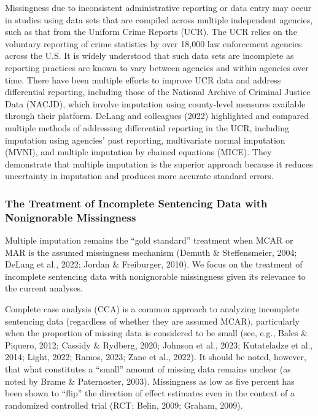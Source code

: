\documentclass[
  letterpaper,
  DIV=11,
  numbers=noendperiod]{scrartcl}
\begin{document}
Missingness due to inconsistent administrative reporting or data entry
may occur in studies using data sets that are compiled across multiple
independent agencies, such as that from the Uniform Crime Reports (UCR).
The UCR relies on the voluntary reporting of crime statistics by over
18,000 law enforcement agencies across the U.S. It is widely understood
that such data sets are incomplete as reporting practices are known to
vary between agencies and within agencies over time. There have been
multiple efforts to improve UCR data and address differential reporting,
including those of the National Archive of Criminal Justice Data
(NACJD), which involve imputation using county-level measures available
through their platform. DeLang and colleagues (2022) highlighted and
compared multiple methods of addressing differential reporting in the
UCR, including imputation using agencies' past reporting, multivariate
normal imputation (MVNI), and multiple imputation by chained equations
(MICE). They demonstrate that multiple imputation is the superior
approach because it reduces uncertainty in imputation and produces more
accurate standard errors.

\hypertarget{the-treatment-of-incomplete-sentencing-data-with-nonignorable-missingness}{%
\subsubsection{The Treatment of Incomplete Sentencing Data with
Nonignorable
Missingness}\label{the-treatment-of-incomplete-sentencing-data-with-nonignorable-missingness}}

Multiple imputation remains the ``gold standard'' treatment when MCAR or
MAR is the assumed missingness mechanism (Demuth \& Steffensmeier, 2004;
DeLang et al., 2022; Jordan \& Freiburger, 2010). We focus on the
treatment of incomplete sentencing data with nonignorable missingness
given its relevance to the current analyses.

Complete case analysis (CCA) is a common approach to analyzing
incomplete sentencing data (regardless of whether they are assumed
MCAR), particularly when the proportion of missing data is considered to
be small (see, e.g., Bales \& Piquero, 2012; Cassidy \& Rydberg, 2020;
Johnson et al., 2023; Kutateladze et al., 2014; Light, 2022; Ramos,
2023; Zane et al., 2022). It should be noted, however, that what
constitutes a ``small'' amount of missing data remains unclear (as noted
by Brame \& Paternoster, 2003). Missingness as low as five percent has
been shown to ``flip'' the direction of effect estimates even in the
context of a randomized controlled trial (RCT; Belin, 2009; Graham,
2009).
\end{document}
